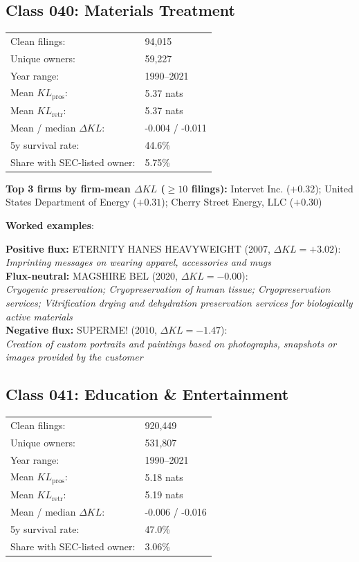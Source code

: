 \subsection*{Class 040: Materials Treatment}
\label{app:industry-040}

\begin{tabular}{ll}
Clean filings: & 94,015 \\
Unique owners: & 59,227 \\
Year range: & 1990--2021 \\
Mean $KL_\text{pros}$: & 5.37 nats \\
Mean $KL_\text{retr}$: & 5.37 nats \\
Mean / median $\Delta KL$: & -0.004 / -0.011 \\
5y survival rate: & 44.6\% \\
Share with SEC-listed owner: & 5.75\% \\
\end{tabular}

\textbf{Top 3 firms by firm-mean $\Delta KL$ ($\geq 10$ filings):} Intervet Inc. ($+0.32$); United States Department of Energy ($+0.31$); Cherry Street Energy, LLC ($+0.30$)

\textbf{Worked examples}:

  \textbf{Positive flux:} \textsc{ETERNITY HANES HEAVYWEIGHT} (2007, $\Delta KL=+3.02$):\\
  \textit{Imprinting messages on wearing apparel, accessories and mugs}\\
  \textbf{Flux-neutral:} \textsc{MAGSHIRE BEL} (2020, $\Delta KL=-0.00$):\\
  \textit{Cryogenic preservation; Cryopreservation of human tissue; Cryopreservation services; Vitrification drying and dehydration preservation services for biologically active materials}\\
  \textbf{Negative flux:} \textsc{SUPERME!} (2010, $\Delta KL=-1.47$):\\
  \textit{Creation of custom portraits and paintings based on photographs, snapshots or images provided by the customer}\\

\subsection*{Class 041: Education \& Entertainment}
\label{app:industry-041}

\begin{tabular}{ll}
Clean filings: & 920,449 \\
Unique owners: & 531,807 \\
Year range: & 1990--2021 \\
Mean $KL_\text{pros}$: & 5.18 nats \\
Mean $KL_\text{retr}$: & 5.19 nats \\
Mean / median $\Delta KL$: & -0.006 / -0.016 \\
5y survival rate: & 47.0\% \\
Share with SEC-listed owner: & 3.06\% \\
\end{tabular}


